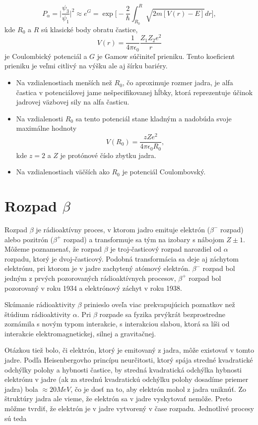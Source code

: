 \documentclass[../../main.tex]{subfiles}
\begin{document}
$$ P_{\alpha} = \bigg\vert \frac{\psi_3}{\psi_1} \bigg\vert^2 \approx e^G = \exp \bigg[ -\frac{2}{\hbar} \int_{R_0}^R \sqrt{2m[V(r)-E]}dr  \bigg],$$
kde $R_0$ a $R$ sú klasické body obratu častice, 
$$ V(r)=\frac{1}{4\pi \epsilon_0} \frac{Z_1 Z_2 e^2}{r} $$
je Coulombický potenciál a $G$ je Gamow súčiniteľ prieniku. Tento koeficient prieniku je veľmi citlivý na výšku ale aj šírku bariéry. 

\begin{itemize}
\item Na vzdialenostiach menších než $R_0$, čo aproximuje rozmer jadra, je alfa častica v potenciálovej jame nešpecifikovanej hĺbky, ktorá reprezentuje účinok jadrovej väzbovej sily na alfa časticu. 
\item Na vzdialenosti $R_0$ sa tento potenciál stane kladným a nadobúda svoje maximálne hodnoty
$$ V(R_0) = \frac{zZe^2}{4\pi \epsilon_0 R_0}, $$ 
kde $z=2$ a $Z$ je protónové číslo zbytku jadra. 
\item Na vzdialenostiach väčších ako $R_0$ je potenciál Coulombovský.
\end{itemize}

\section{Rozpad $\beta$}
Rozpad $\beta$ je rádioaktívny proces, v ktorom jadro emituje elektrón ($\beta^-$ rozpad) alebo pozitrón ($\beta^+$ rozpad) a transformuje sa tým na izobary s nábojom $Z\pm1$. Môžeme poznamenať, že rozpad $\beta$ je troj-časticový rozpad narozdiel od $\alpha$ rozpadu, ktorý je dvoj-časticový. Podobná transformácia sa deje aj záchytom elektrónu, pri ktorom je v jadre zachytený atómový elektrón. $\beta^-$ rozpad bol jedným z prvých pozorovaných rádioaktívnych procesov, $\beta^+$ rozpad bol pozorovaný v roku 1934 a elektrónový záchyt v roku 1938.

Skúmanie rádioaktivity $\beta$ prinieslo oveľa viac prekvapujúcich poznatkov než štúdium rádioaktivity $\alpha$. Pri $\beta$ rozpade sa fyzika prvýkrát bezprostredne zoznámila s novým typom interakcie, s interakciou slabou, ktorá sa líši od interakcie elektromagnetickej, silnej a gravitačnej.

Otázkou tiež bolo, či elektrón, ktorý je emitovaný z jadra, môže existovať v tomto jadre. Podľa Heisenbergovho princípu neurčitosti, ktorý spája stredné kvadratické odchýlky polohy a hybnosti častice, by stredná kvadratická odchýlka hybnosti elektrónu v jadre (ak za strednú kvadratickú odchýlku polohy dosadíme priemer jadra) bola $\approx 20 MeV$, čo je dosť na to, aby elektrón mohol z jadra uniknúť. Zo štruktúry jadra ale vieme, že elektrón sa v jadre vyskytovať nemôže. Preto môžme tvrdiť, že elektrón je v jadre vytvorený v čase rozpadu. Jednotlivé procesy sú teda
\end{document}
